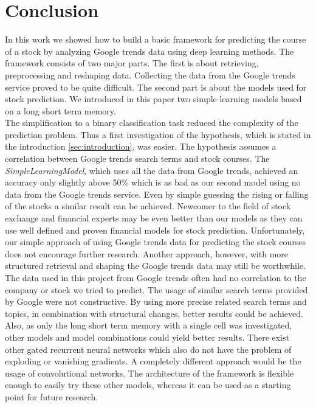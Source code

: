 \section{Conclusion}
\label{sec:ausblick}
In this work we showed how to build a basic framework for predicting the course of a stock by analyzing Google trends data using deep learning methods. The framework consists of two major parts. The first is about retrieving, preprocessing and reshaping data. Collecting the data from the Google trends service proved to be quite difficult. The second part is about the models used for stock prediction. We introduced in this paper two simple learning models based on a long short term memory.\\
The simplification to a binary classification task reduced the complexity of the prediction problem. Thus a first investigation of the hypothesis, which is stated in the introduction \ref{sec:introduction}, was easier. The hypothesis assumes a correlation between Google trends search terms and stock courses. The \textit{SimpleLearningModel}, which uses all the data from Google trends, achieved an accuracy only slightly above 50\% which is as bad as our second model using no data from the Google trends service. Even by simple guessing the rising or falling of the stocks a similar result can be achieved. Newcomer to the field of stock exchange and financial experts may be even better than our models as they can use well defined and proven financial models for stock prediction. Unfortunately, our simple approach of using Google trends data for predicting the stock courses does not encourage further research. Another approach, however, with more structured retrieval and shaping the Google trends data may still be worthwhile. The data used in this project from Google trends often had no correlation to the company or stock we tried to predict. The usage of similar search terms provided by Google were not constructive. By using more precise related search terms and topics, in combination with structural changes, better results could be achieved. Also, as only the long short term memory with a single cell was investigated, other models and model combinations could yield better results. There exist other gated recurrent neural networks which also do not have the problem of exploding or vanishing gradients. A completely different approach would be the usage of convolutional networks. The architecture of the framework is flexible enough to easily try these other models, whereas it can be used as a starting point for future research.
\\
